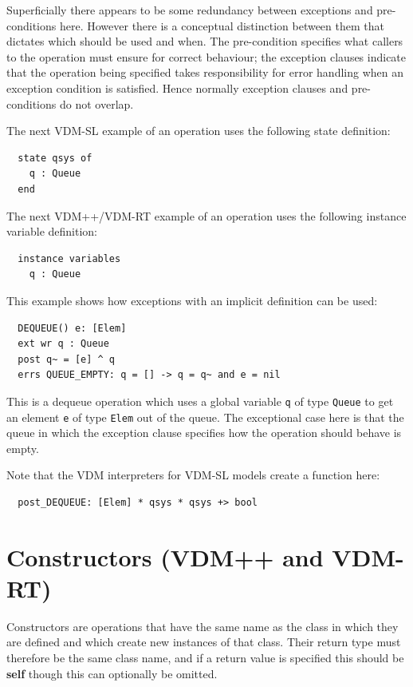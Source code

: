 \documentclass{overturerepchap}
\newcommand{\keyw}[1]{{\bf\ttfamily #1}}
\begin{document}
{\begin{description}
Superficially there appears to be some redundancy between exceptions
and pre-conditions here. However there is a conceptual distinction
between them that dictates which should be used and when. The
pre-condition specifies what callers  to the operation must ensure for
correct behaviour; the exception clauses indicate that the operation
being specified takes responsibility for error handling when an
exception condition is satisfied. Hence normally exception clauses and
pre-conditions do not overlap.

The next VDM-SL example of an operation uses the following state definition:
\begin{lstlisting}
  state qsys of
    q : Queue
  end
\end{lstlisting}

The next VDM++/VDM-RT example of an operation uses the following
instance variable definition:
\begin{lstlisting}
  instance variables
    q : Queue
\end{lstlisting}

This example shows how exceptions with an implicit definition can be used:
\begin{lstlisting}
  DEQUEUE() e: [Elem]
  ext wr q : Queue
  post q~ = [e] ^ q
  errs QUEUE_EMPTY: q = [] -> q = q~ and e = nil
\end{lstlisting}

This is a dequeue operation which uses a global variable {\tt q} of
type {\tt Queue} to get an element {\tt e} of type {\tt Elem} out of
the queue. The exceptional case here is that the queue in
which the exception clause specifies how the operation should
behave is empty.

Note that the VDM interpreters for VDM-SL models create a function here:
\begin{lstlisting}
  post_DEQUEUE: [Elem] * qsys * qsys +> bool
\end{lstlisting}

\end{description}


\section{Constructors (VDM++ and VDM-RT)}\label{constructors}

Constructors are operations that have the same name as the class in
which they are defined and which create new instances of that
class. Their return type must therefore be the same class
name, and if a return value is specified this should be \keyw{self}
though this can optionally be omitted.

}
\end{document}
